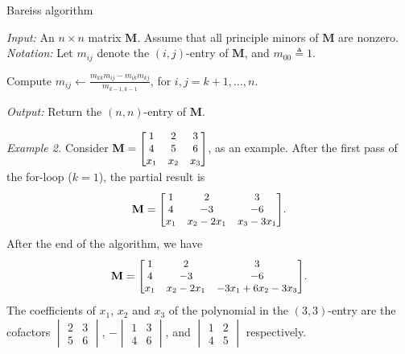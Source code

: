 \documentclass[letterpaper,conference,10pt]{IEEEtran}
\begin{document}
\begin{algorithm}
   \caption{Bareiss algorithm}
   \label{algorithm:Bareiss}
   {\em Input:} An $n \times n $ matrix $\mathbf{M}$. Assume that all principle minors of $\mathbf{M}$ are nonzero.\\
   {\em Notation:} Let $m_{ij}$ denote the $(i,j)$-entry of $\mathbf{M}$, and $m_{00} \triangleq 1$.

   \begin{algorithmic}
           \STATE Compute $m_{ij} \leftarrow \frac{m_{kk}m_{ij} - m_{ik} m_{kj}}{m_{k-1,k-1}}$,
           for $i,j = k+1, \ldots, n$.
       \ENDFOR
   \end{algorithmic}
   {\em Output:} Return the $(n,n)$-entry of $\mathbf{M}$.
\end{algorithm}

{\em Example 2.} Consider
${\small
 \mathbf{M} = \begin{bmatrix} 1 & 2 & 3 \\ 4 & 5 & 6 \\ x_1 &x_2 & x_3 \end{bmatrix}}$,
as an example. After the first pass of the for-loop ($k=1$), the partial result is
\[ {\small
 \mathbf{M} = \begin{bmatrix}
 1 & 2 & 3 \\
 4 & -3 & -6 \\
 x_1 &x_2-2x_1 & x_3-3x_1 \end{bmatrix}}.
\]
After the end of the algorithm, we have
\[ {\small
 \mathbf{M} = \begin{bmatrix}
 1 & 2 & 3 \\
 4 & -3 & -6 \\
 x_1 &x_2-2x_1 & -3x_1 + 6x_2-3x_3 \end{bmatrix}}.
\]
The coefficients of $x_1$, $x_2$ and $x_3$ of the polynomial in the $(3,3)$-entry are the cofactors
$
\begin{vmatrix} 2&3 \\ 5&6 \end{vmatrix}$,
$-\begin{vmatrix} 1&3 \\ 4&6 \end{vmatrix}$, and
$\begin{vmatrix} 1&2 \\ 4&5 \end{vmatrix}$ respectively.
\end{document}
